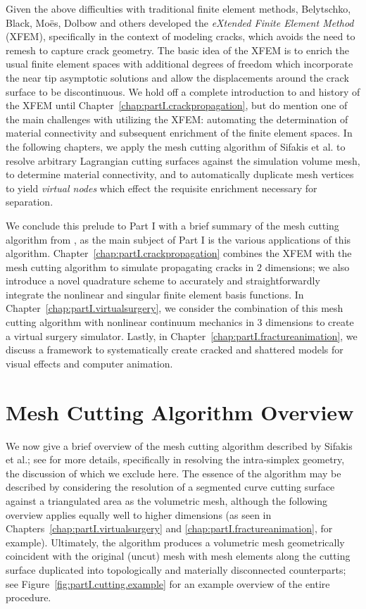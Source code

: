 Given the above difficulties with traditional finite element methods, Belytschko, Black, Mo\"{e}s, Dolbow \cite{Belytschko99, Moes99} and others developed the \emph{eXtended Finite Element Method} (XFEM), specifically in the context of modeling cracks, which avoids the need to remesh to capture crack geometry. The basic idea of the XFEM is to enrich the usual finite element spaces with additional degrees of freedom which incorporate the near tip asymptotic solutions and allow the displacements around the crack surface to be discontinuous. We hold off a complete introduction to and history of the XFEM until Chapter~\ref{chap:partI.crackpropagation}, but do mention one of the main challenges with utilizing the XFEM: automating the determination of material connectivity and subsequent enrichment of the finite element spaces. In the following chapters, we apply the mesh cutting algorithm of Sifakis et al. \cite{Sifakis07} to resolve arbitrary Lagrangian cutting surfaces against the simulation volume mesh, to determine material connectivity, and to automatically duplicate mesh vertices to yield \emph{virtual nodes} which effect the requisite enrichment necessary for separation.

We conclude this prelude to Part I with a brief summary of the mesh cutting algorithm from \cite{Sifakis07}, as the main subject of Part I is the various applications of this algorithm. Chapter~\ref{chap:partI.crackpropagation} combines the XFEM with the mesh cutting algorithm to simulate propagating cracks in $2$ dimensions; we also introduce a novel quadrature scheme to accurately and straightforwardly integrate the nonlinear and singular finite element basis functions. In Chapter~\ref{chap:partI.virtualsurgery}, we consider the combination of this mesh cutting algorithm with nonlinear continuum mechanics in $3$ dimensions to create a virtual surgery simulator. Lastly, in Chapter~\ref{chap:partI.fractureanimation}, we discuss a framework to systematically create cracked and shattered models for visual effects and computer animation.

\section*{Mesh Cutting Algorithm Overview}

We now give a brief overview of the mesh cutting algorithm described by Sifakis et al.; see \cite{Sifakis07} for more details, specifically in resolving the intra-simplex geometry, the discussion of which we exclude here. The essence of the algorithm may be described by considering the resolution of a segmented curve cutting surface against a triangulated area as the volumetric mesh, although the following overview applies equally well to higher dimensions (as seen in Chapters~\ref{chap:partI.virtualsurgery} and \ref{chap:partI.fractureanimation}, for example). Ultimately, the algorithm produces a volumetric mesh geometrically coincident with the original (uncut) mesh with mesh elements along the cutting surface duplicated into topologically and materially disconnected counterparts; see Figure~\ref{fig:partI.cutting.example} for an example overview of the entire procedure.

